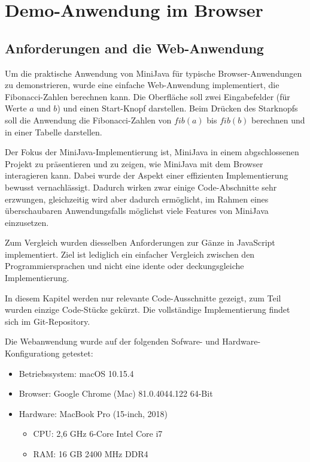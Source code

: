 \chapter{Demo-Anwendung im Browser}

\section{Anforderungen and die Web-Anwendung}

Um die praktische Anwendung von MiniJava für typische Browser-Anwendungen zu demonstrieren, wurde eine einfache Web-Anwendung implementiert, die Fibonacci-Zahlen berechnen kann. Die Oberfläche soll zwei Eingabefelder (für Werte $a$ und $b$) und einen Start-Knopf darstellen. Beim Drücken des Starknopfs soll die Anwendung die Fibonacci-Zahlen von $fib(a)$ bis $fib(b)$ berechnen und in einer Tabelle darstellen.

Der Fokus der MiniJava-Implementierung ist, MiniJava in einem abgschlossenen Projekt zu präsentieren und zu zeigen, wie MiniJava mit dem Browser interagieren kann. Dabei wurde der Aspekt einer effizienten Implementierung bewusst vernachlässigt. Dadurch wirken zwar einige Code-Abschnitte sehr erzwungen, gleichzeitig wird aber dadurch ermöglicht, im Rahmen eines überschaubaren Anwendungsfalls möglichst viele Features von MiniJava einzusetzen. 

Zum Vergleich wurden diesselben Anforderungen zur Gänze in JavaScript implementiert. Ziel ist lediglich ein einfacher Vergleich zwischen den Programmiersprachen und nicht eine idente oder deckungsgleiche Implementierung.

In diesem Kapitel werden nur relevante Code-Ausschnitte gezeigt, zum Teil wurden einzige Code-Stücke gekürzt. Die vollständige Implementierung findet sich im Git-Re\-pository.

Die Webanwendung wurde auf der folgenden Sofware- und Hardware-Konfigurationg getestet:
\begin{itemize}
    \item Betriebssystem: macOS 10.15.4
    \item Browser: Google Chrome (Mac) 81.0.4044.122 64-Bit
    \item Hardware: MacBook Pro (15-inch, 2018)
    \begin{itemize}
        \item CPU: 2,6 GHz 6-Core Intel Core i7
        \item RAM: 16 GB 2400 MHz DDR4
    \end{itemize}
\end{itemize}

